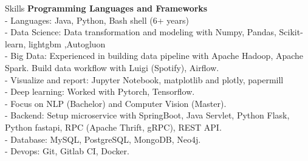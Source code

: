 \documentclass{resume} %
\begin{document}






\begin{rSection}{Skills}
{\bf Programming Languages and Frameworks }
\\ - Languages: Java, Python,  Bash shell (6+ years)
\\ - Data Science: Data transformation and modeling with Numpy, Pandas, Scikit-learn, lightgbm ,Autogluon
\\ - Big Data: Experienced in building data pipeline with Apache Hadoop, Apache Spark. Build data workflow with Luigi (Spotify), Airflow.
\\ - Visualize and report: Jupyter Notebook, matplotlib and plotly, papermill
\\ - Deep learning: Worked with Pytorch, Tensorflow. 
\\ - Focus on NLP (Bachelor) and Computer Vision (Master). 
\\ - Backend: Setup microservice with SpringBoot, Java Servlet, Python Flask, Python fastapi, RPC (Apache Thrift, gRPC), REST API. 
\\ - Database: MySQL, PostgreSQL, MongoDB, Neo4j. 
\\ - Devops: Git, Gitlab CI, Docker.
\end{rSection}
\end{document}
